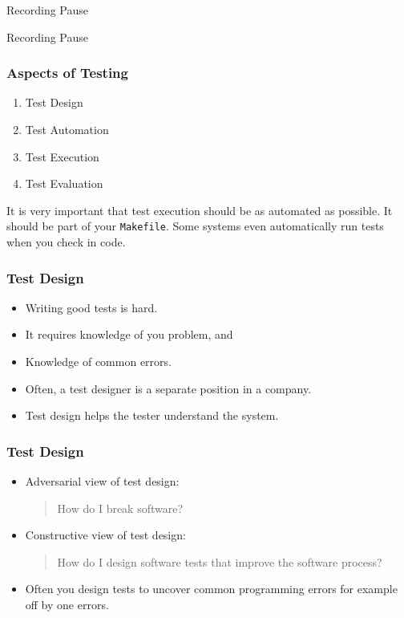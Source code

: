 \documentclass{beamer}
\begin{document}
\begin{frame}{Recording Pause}
  \begin{center}
    Recording Pause
  \end{center}
\end{frame}
\begin{frame}
  \frametitle{Aspects of Testing}
  \begin{enumerate}
  \item Test Design
  \item Test Automation
  \item Test Execution
  \item Test Evaluation
  \end{enumerate}
It is very important that test execution should be as automated as possible. It
should be part of your {\tt Makefile}. Some systems even automatically
run tests when you check in code.
\end{frame}
\begin{frame}
  \frametitle{Test Design}
  \begin{itemize}
  \item  Writing good tests is  hard. 
  \item It requires knowledge of you  problem, and 
  \item Knowledge of common errors.
  \item Often, a test designer is a separate  position in a company.
  \item Test design helps the tester understand the system.
  \end{itemize}
\end{frame}
\begin{frame}
  \frametitle{Test Design}
  
  \begin{itemize}
  \item Adversarial view of test design: 
    \begin{quote}
       How do I break software? \pause
    \end{quote}
  \item Constructive view of test design:
    \begin{quote}
       How do I design software tests that improve the software process?
     \end{quote}
   \item Often you design tests to uncover common programming errors
     for example off by one errors.
  \end{itemize}
\end{frame}
\end{document}
